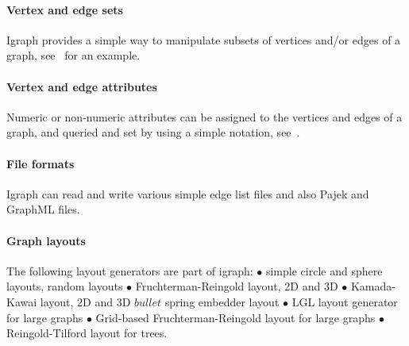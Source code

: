 \documentclass[twoside]{book}%
\begin{document}
\paragraph{Vertex and edge sets} Igraph provides a simple way to
manipulate subsets of vertices and/or edges of a graph,
see~ for an example. 

\paragraph{Vertex and edge attributes} Numeric or non-numeric
attributes can be assigned to the vertices and edges of a graph, and
queried and set by using a simple notation, see~. 

\paragraph{File formats} Igraph can read and write various simple edge
list files and also Pajek and GraphML files.

\paragraph{Graph layouts} The following layout generators are part of
igraph: $\bullet$ simple circle and sphere layouts, random layouts
$\bullet$ Fruchterman-Reingold layout, 2D and 3D $\bullet$
Kamada-Kawai layout, 2D and 3D $bullet$ spring embedder layout
$\bullet$ LGL layout generator for large graphs $\bullet$ Grid-based
Fruchterman-Reingold layout for large graphs $\bullet$
Reingold-Tilford layout for trees.


\end{document}
